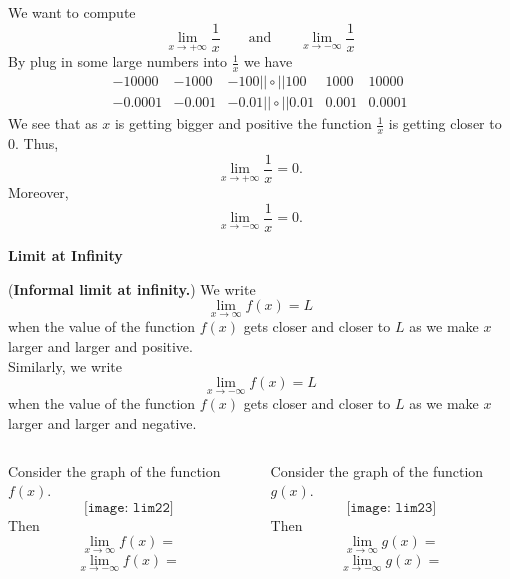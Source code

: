 \documentclass{beamer}
\begin{document}
\begin{frame}
\begin{Example}
	We want to compute 
	$$\lim_{x\to +\infty} \frac{1}{x} \quad \quad \text{and}\quad \quad \lim_{x\to -\infty} \frac{1}{x}$$ By plug in some large numbers into $\frac{1}{x}$ we have
	$$	\begin{array}{c|c|c|c|c|c|c}
	-10000&-1000 & -100 ||\circ || 100 & 1000& 10000\\
	\hline
	-0.0001& -0.001 & -0.01  ||\circ || 0.01 & 0.001& 0.0001
	\end{array}
	$$
	We see that as $x$ is getting bigger and  positive the function $\frac{1}{x}$ is getting closer to  $0$. Thus, 
	$$\lim_{x\to +\infty} \frac{1}{x}=0.$$ Moreover,
	$$\lim_{x\to -\infty} \frac{1}{x}=0.$$
\end{Example}
\end{frame}

\begin{frame}
\begin{center}
{\bf \color{blue}Limit at Infinity}
\end{center}

\end{frame}

\begin{frame}
\begin{tcolorbox}[width=\textwidth,colback={red!5},title={},colbacktitle=yellow,coltitle=blue] 
\begin{definition}({\bf Informal limit at infinity.})
	We write 
	$$\lim_{x\to \infty} f(x)=L$$ when the value of the function $f(x)$ gets closer and closer to $L$ as we make $x$ larger and larger and positive.\\
	Similarly, we write 
	$$\lim_{x\to -\infty}f(x)=L$$ when the value of the function $f(x)$ gets closer and closer to $L$ as we make $x$ larger and larger and negative.
\end{definition}
\end{tcolorbox}
\end{frame}

\begin{frame}
\begin{columns}
	\begin{column}{.48\textwidth}
\begin{Example}
	Consider the graph of the function $f(x)$. 
	$$
	\texttt{[image: lim22]}
	$$
	Then 
	$$\lim_{x\to \infty} f(x)=$$ $$ \lim_{x\to -\infty} f(x)=$$ 
\end{Example}
\end{column}



\begin{column}{.48\textwidth}
\begin{Example}
	Consider the graph of the function $g(x)$. 
	$$
	\texttt{[image: lim23]}
	$$
	Then 
	$$\lim_{x\to \infty} g(x)=$$ $$ \lim_{x\to -\infty} g(x)=$$ 
\end{Example}
\end{column}
\end{columns}
\end{frame}
\end{document}
